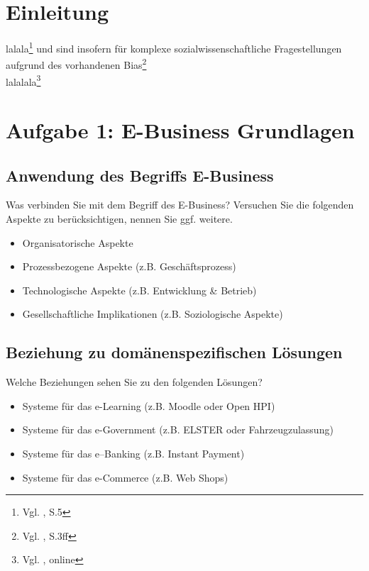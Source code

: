 \documentclass[notitlepage, hidelinks]{article}
\begin{document}
\thispagestyle{empty}
\clearpage
\newpage
\tableofcontents
\thispagestyle{empty}
\clearpage

\normalsize
{}


\section{Einleitung}
lalala\footnote{Vgl. \cite{athey2018impact}, S.5} und sind insofern für komplexe sozialwissenschaftliche Fragestellungen aufgrund des vorhandenen Bias\footnote{Vgl. \cite{miceli2022studying}, S.3ff} \\
lalalala\footnote{Vgl. \cite{blogKorab}, online}

\section{Aufgabe 1: E-Business Grundlagen}

\subsection{Anwendung des Begriffs E-Business}
Was verbinden Sie mit dem Begriff des E-Business? Versuchen Sie die folgenden Aspekte zu berücksichtigen, nennen Sie ggf. weitere.
\begin{itemize}
\item Organisatorische Aspekte
\item Prozessbezogene Aspekte (z.B. Geschäftsprozess)
\item Technologische Aspekte (z.B. Entwicklung \& Betrieb)
\item Gesellschaftliche Implikationen (z.B. Soziologische Aspekte)
\end{itemize}

\subsection{Beziehung zu domänenspezifischen Lösungen}
Welche Beziehungen sehen Sie zu den folgenden Lösungen?
\begin{itemize}
\item Systeme für das e-Learning (z.B. Moodle oder Open HPI)
\item Systeme für das e-Government (z.B. ELSTER oder Fahrzeugzulassung)
\item Systeme für das e–Banking (z.B. Instant Payment)
\item Systeme für das e-Commerce (z.B. Web Shops)
\end{itemize}
\end{document}
